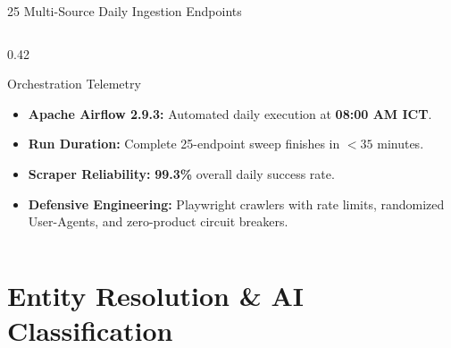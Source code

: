 \documentclass[aspectratio=169, 10pt]{beamer}
\begin{document}
\begin{frame}{25 Multi-Source Daily Ingestion Endpoints}
\begin{columns}
    \begin{column}{0.42\textwidth}
      \begin{block}{Orchestration Telemetry}
        \begin{itemize}
          \item \textbf{Apache Airflow 2.9.3:} Automated daily execution at \textbf{08:00 AM ICT}.
          \item \textbf{Run Duration:} Complete 25-endpoint sweep finishes in $< 35$ minutes.
          \item \textbf{Scraper Reliability:} \textbf{99.3\%} overall daily success rate.
          \item \textbf{Defensive Engineering:} Playwright crawlers with rate limits, randomized User-Agents, and zero-product circuit breakers.
        \end{itemize}
      \end{block}
    \end{column}
  \end{columns}
\end{frame}

\section{Entity Resolution \& AI Classification}
\end{document}
